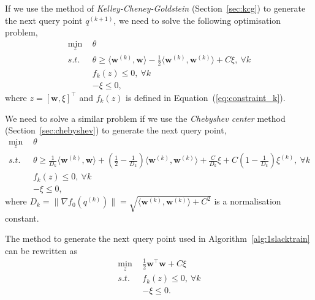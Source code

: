 \documentclass[9pt]{extarticle}
\begin{document}
If we use the method of \emph{Kelley-Cheney-Goldstein} (Section~\ref{sec:kcg}) to generate the next query point $q^{(k+1)}$,
we need to solve the following optimisation problem,
\begin{equation}
\label{eq:1slack_kcg}
\begin{aligned}
\min_{z} ~& \theta \\
s.t.~~ ~& \theta \ge \langle \mathbf{w}^{(k)}, \mathbf{w} \rangle - \frac{1}{2} \langle \mathbf{w}^{(k)}, \mathbf{w}^{(k)} \rangle + C\xi,~ \forall k \\
        & f_k(z) \le 0,~ \forall k \\
        & -\xi \le 0,
\end{aligned}
\end{equation}
where $z = [\mathbf{w}, \xi]^\top$ and $f_k(z)$ is defined in Equation~(\ref{eq:constraint_k}).


We need to solve a similar problem if we use the \emph{Chebyshev center} method (Section~\ref{sec:chebyshev}) to generate the next query point,
\begin{equation}
\label{eq:1slack_chebyshev}
\begin{aligned}
\min_{z} ~& \theta \\
s.t.~~ ~& \theta \ge 
          \frac{1}{D_k} \langle \mathbf{w}^{(k)}, \mathbf{w} \rangle + 
          (\frac{1}{2} - \frac{1}{D_k}) \langle \mathbf{w}^{(k)}, \mathbf{w}^{(k)} \rangle + 
          \frac{C}{D_k}\xi + C (1 - \frac{1}{D_k}) \xi^{(k)},~ \forall k \\
        & f_k(z) \le 0,~ \forall k \\
        & -\xi \le 0,
\end{aligned}
\end{equation}
where $D_k = \|\nabla f_0(q^{(k)})\| = \sqrt{\langle \mathbf{w}^{(k)}, \mathbf{w}^{(k)} \rangle + C^2}$ is a normalisation constant.


The method to generate the next query point used in Algorithm~\ref{alg:1slacktrain} can be rewritten as
\begin{equation}
\label{eq:1slack_query}
\begin{aligned}
\min_{z} ~& \frac{1}{2} \mathbf{w}^\top \mathbf{w} + C \xi \\
s.t.~~ ~& f_k(z) \le 0,~ \forall k \\
        & -\xi \le 0.
\end{aligned}
\end{equation}
\end{document}
